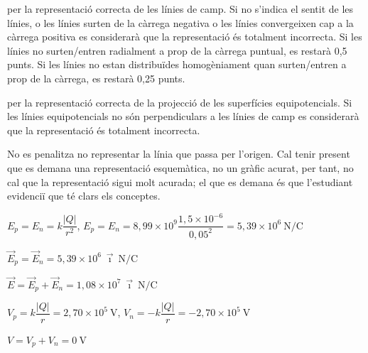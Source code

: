 \begin{solapartat}
 per la representació correcta de les línies de camp. Si no s'indica el sentit de les línies, o les línies surten de la càrrega negativa o les línies convergeixen cap a la càrrega positiva es considerarà que la representació és totalment incorrecta. Si les línies no surten/entren radialment a prop de la càrrega puntual, es restarà 0,5 punts. Si les línies no estan distribuïdes homogèniament quan surten/entren a prop de la càrrega, es restarà 0,25 punts.

 per la representació correcta de la projecció de les superfícies equipotencials. Si les línies equipotencials no són perpendiculars a les línies de camp es considerarà que la representació és totalment incorrecta.

No es penalitza no representar la línia que passa per l'origen. Cal tenir present que es demana una representació esquemàtica, no un gràfic acurat, per tant, no cal que la representació sigui molt acurada; el que es demana és que l'estudiant evidenciï que té clars els conceptes.

\end{solapartat}

\begin{solapartat}
 $E_p = E_n = k\dfrac{|Q|}{r^2}$, $E_p = E_n = 8,99\times 10^{9}\dfrac{1,5\times 10^{-6}}{0,05^2} = 5,39\times 10^{6}\ \mathrm{N/C}$

 $\vec{E}_p = \vec{E}_n = 5,39\times 10^{6}\ \vec{\imath}\ \mathrm{N/C}$

 $\vec{E} = \vec{E}_p + \vec{E}_n = 1,08\times 10^{7}\ \vec{\imath}\ \mathrm{N/C}$

 $V_p = k\dfrac{|Q|}{r} = 2,70\times 10^{5}\ \mathrm{V}$, $V_n = -k\dfrac{|Q|}{r} = -2,70\times 10^{5}\ \mathrm{V}$

$V = V_p + V_n = 0\ \mathrm{V}$
\end{solapartat}
